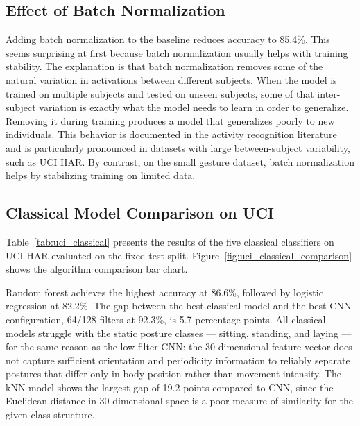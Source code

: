 \subsection{Effect of Batch Normalization}
\label{sec:uci_window_bn}
 
Adding batch normalization to the baseline reduces accuracy to 85.4\%. This seems surprising at first because batch normalization usually helps with training stability. The explanation is that batch normalization removes some of the natural variation in activations between different subjects. When the model is trained on multiple subjects and tested on unseen subjects, some of that inter-subject variation is exactly what the model needs to learn in order to generalize. Removing it during training produces a model that generalizes poorly to new individuals. This behavior is documented in the activity recognition literature and is particularly pronounced in datasets with large between-subject variability, such as UCI HAR. By contrast, on the small gesture dataset, batch normalization helps by stabilizing training on limited data.
 
 
\subsection{Classical Model Comparison on UCI}
\label{sec:uci_classical}
 
Table~\ref{tab:uci_classical} presents the results of the five classical classifiers on UCI HAR evaluated on the fixed test split. Figure~\ref{fig:uci_classical_comparison} shows the algorithm comparison bar chart.

Random forest achieves the highest accuracy at 86.6\%, followed by logistic regression at 82.2\%. The gap between the best classical model and the best CNN configuration, 64/128 filters at 92.3\%, is 5.7 percentage points. All classical models struggle with the static posture classes — sitting, standing, and laying — for the same reason as the low-filter CNN: the 30-dimensional feature vector does not capture sufficient orientation and periodicity information to reliably separate postures that differ only in body position rather than movement intensity. The kNN model shows the largest gap of 19.2 points compared to CNN, since the Euclidean distance in 30-dimensional space is a poor measure of similarity for the given class structure.
 
